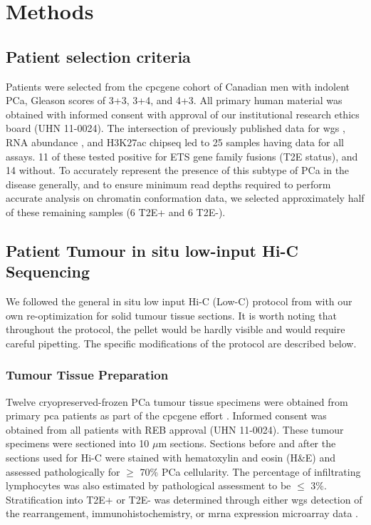 \section{Methods}

\subsection{Patient selection criteria}

Patients were selected from the \gls{cpcgene} cohort of Canadian men with indolent PCa, Gleason scores of 3+3, 3+4, and 4+3.
All primary human material was obtained with informed consent with approval of our institutional research ethics board (UHN 11-0024).
The intersection of previously published data for \gls{wgs} \cite{fraserGenomicHallmarksLocalized2017}, RNA abundance \cite{chenWidespreadFunctionalRNA2019}, and H3K27ac \gls{chipseq} \cite{kronTMPRSS2ERGFusion2017} led to 25 samples having data for all assays.
11 of these tested positive for ETS gene family fusions (T2E status), and 14 without.
To accurately represent the presence of this subtype of PCa in the disease generally, and to ensure minimum read depths required to perform accurate analysis on chromatin conformation data, we selected approximately half of these remaining samples (6 T2E+ and 6 T2E-).

\subsection{Patient Tumour in situ low-input Hi-C Sequencing}

We followed the general in situ low input Hi-C (Low-C) protocol from \cite[REF][]{diazChromatinConformationAnalysis2018} with our own re-optimization for solid tumour tissue sections.
It is worth noting that throughout the protocol, the pellet would be hardly visible and would require careful pipetting.
The specific modifications of the protocol are described below.

\subsubsection{Tumour Tissue Preparation}

Twelve cryopreserved-frozen PCa tumour tissue specimens were obtained from primary \gls{pca} patients as part of the \gls{cpcgene} effort \cite{fraserGenomicHallmarksLocalized2017}.
Informed consent was obtained from all patients with REB approval (UHN 11-0024).
These tumour specimens were sectioned into 10 $\mu$m sections.
Sections before and after the sections used for Hi-C were stained with hematoxylin and eosin (H\&E) and assessed pathologically for $\ge$ 70\% PCa cellularity.
The percentage of infiltrating lymphocytes was also estimated by pathological assessment to be $\le$ 3\%.
Stratification into T2E+ or T2E- was determined through either \gls{wgs} detection of the rearrangement, immunohistochemistry, or \gls{mrna} expression microarray data \cite{fraserGenomicHallmarksLocalized2017}.

